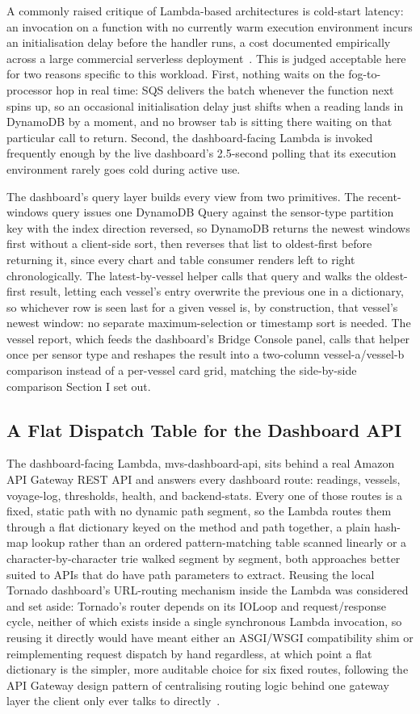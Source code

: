 \documentclass[conference]{IEEEtran}
\begin{document}
A commonly raised critique of Lambda-based architectures is cold-start latency: an invocation on a function with no currently warm execution environment incurs an initialisation delay before the handler runs, a cost documented empirically across a large commercial serverless deployment~\cite{ref7}. This is judged acceptable here for two reasons specific to this workload. First, nothing waits on the fog-to-processor hop in real time: SQS delivers the batch whenever the function next spins up, so an occasional initialisation delay just shifts when a reading lands in DynamoDB by a moment, and no browser tab is sitting there waiting on that particular call to return. Second, the dashboard-facing Lambda is invoked frequently enough by the live dashboard's 2.5-second polling that its execution environment rarely goes cold during active use.

The dashboard's query layer builds every view from two primitives. The recent-windows query issues one DynamoDB Query against the sensor-type partition key with the index direction reversed, so DynamoDB returns the newest windows first without a client-side sort, then reverses that list to oldest-first before returning it, since every chart and table consumer renders left to right chronologically. The latest-by-vessel helper calls that query and walks the oldest-first result, letting each vessel's entry overwrite the previous one in a dictionary, so whichever row is seen last for a given vessel is, by construction, that vessel's newest window: no separate maximum-selection or timestamp sort is needed. The vessel report, which feeds the dashboard's Bridge Console panel, calls that helper once per sensor type and reshapes the result into a two-column vessel-a/vessel-b comparison instead of a per-vessel card grid, matching the side-by-side comparison Section I set out.

\subsection{A Flat Dispatch Table for the Dashboard API}
The dashboard-facing Lambda, mvs-dashboard-api, sits behind a real Amazon API Gateway REST API and answers every dashboard route: readings, vessels, voyage-log, thresholds, health, and backend-stats. Every one of those routes is a fixed, static path with no dynamic path segment, so the Lambda routes them through a flat dictionary keyed on the method and path together, a plain hash-map lookup rather than an ordered pattern-matching table scanned linearly or a character-by-character trie walked segment by segment, both approaches better suited to APIs that do have path parameters to extract. Reusing the local Tornado dashboard's URL-routing mechanism inside the Lambda was considered and set aside: Tornado's router depends on its IOLoop and request/response cycle, neither of which exists inside a single synchronous Lambda invocation, so reusing it directly would have meant either an ASGI/WSGI compatibility shim or reimplementing request dispatch by hand regardless, at which point a flat dictionary is the simpler, more auditable choice for six fixed routes, following the API Gateway design pattern of centralising routing logic behind one gateway layer the client only ever talks to directly~\cite{ref8}.
\end{document}
